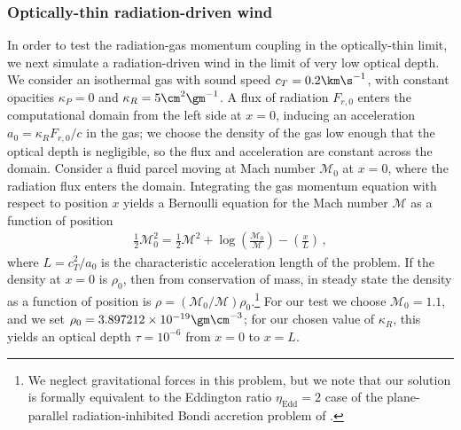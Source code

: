 \documentclass[fleqn,usenatbib]{mnras}
\begin{document}
\subsubsection{Optically-thin radiation-driven wind}
\label{section:thinwind}
In order to test the radiation-gas momentum coupling in the optically-thin limit, we next simulate a radiation-driven wind in the limit of very low optical depth. We consider an isothermal gas with sound speed $c_T = 0.2 \km \s^{-1}$, with constant opacities $\kappa_P = 0$ and $\kappa_R = 5 \cm^2 \gm^{-1}$. A flux of radiation $F_{r,0}$ enters the computational domain from the left side at $x=0$, inducing an acceleration $a_0 = \kappa_R F_{r,0}/c$ in the gas; we choose the density of the gas low enough that the optical depth is negligible, so the flux and acceleration are constant across the domain. Consider a fluid parcel moving at Mach number $\mathcal{M}_0$ at $x = 0$, where the radiation flux enters the domain. Integrating the gas momentum equation with respect to position $x$ yields a Bernoulli equation for the Mach number $\mathcal{M}$ as a function of position
\begin{align}
\frac{1}{2} \mathcal{M}_0^2 = \frac{1}{2} \mathcal{M}^2 + \log \left({\frac{\mathcal{M}_0}{\mathcal{M}}}\right) - \left( \frac{x}{L} \right) \, ,
\label{eq:wind}
\end{align}
where $L = c_T^2/a_0$ is the characteristic acceleration length of the problem. If the density at $x = 0$ is $\rho_0$, then from conservation of mass, in steady state the density as a function of position is $\rho = (\mathcal{M}_0/\mathcal{M}) \rho_0$.\footnote{We neglect gravitational forces in this problem, but we note that our solution is formally equivalent to the Eddington ratio $\eta_{\text{Edd}} = 2$ case of the plane-parallel radiation-inhibited Bondi accretion problem of \cite{Skinner_2013}.} For our test we choose $\mathcal{M}_0 = 1.1$, and we set $\rho_0 = 3.897212 \times 10^{-19} \gm \cm^{-3}$; for our chosen value of $\kappa_R$, this yields an optical depth $\tau = 10^{-6}$ from $x=0$ to $x=L$.
\end{document}
